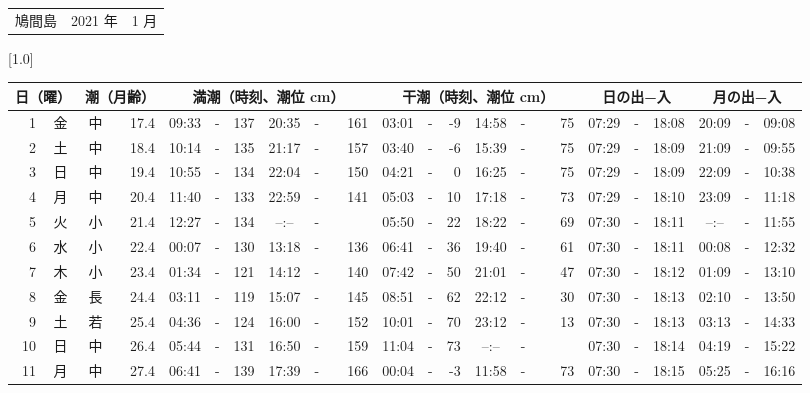 \documentclass[12pt,a4j]{jsarticle}
\begin{document}
 \begin{table}[htbp]
 \begin{center}
 \begin{tabular}{lcc}
 \LARGE{鳩間島}  & \large{2021 年} & \large{ 1 月} \\
 \end{tabular}
 \end{center}
 \begin{center}
    \scalebox{0.7}[1.0]{
    \begin{tabular}{|rc|cr|ccrccr|ccrccr|ccc|ccc|}
    \hline
    \multicolumn{2}{|c|}{日（曜）} & \multicolumn{2}{c|}{潮（月齢）} & \multicolumn{6}{c|}{満潮（時刻、潮位 cm）} & \multicolumn{6}{c|}{干潮（時刻、潮位 cm）} & \multicolumn{3}{c|}{日の出−入} &  \multicolumn{3}{c|}{月の出−入}\\
 \hline
 1 & 金 & 中 & 17.4 &  09:33 &-& 137 &  20:35 &-& 161 &  03:01 &-&  -9 &  14:58 &-&  75 & 07:29 & -& 18:08 & 20:09 & -& 09:08 \\
 2 & 土 & 中 & 18.4 &  10:14 &-& 135 &  21:17 &-& 157 &  03:40 &-&  -6 &  15:39 &-&  75 & 07:29 & -& 18:09 & 21:09 & -& 09:55 \\
 3 & 日 & 中 & 19.4 &  10:55 &-& 134 &  22:04 &-& 150 &  04:21 &-&   0 &  16:25 &-&  75 & 07:29 & -& 18:09 & 22:09 & -& 10:38 \\
 4 & 月 & 中 & 20.4 &  11:40 &-& 133 &  22:59 &-& 141 &  05:03 &-&  10 &  17:18 &-&  73 & 07:29 & -& 18:10 & 23:09 & -& 11:18 \\
 5 & 火 & 小 & 21.4 &  12:27 &-& 134 &  --:-- &-&~~~~~ &  05:50 &-&  22 &  18:22 &-&  69 & 07:30 & -& 18:11 & --:-- & -& 11:55 \\
 6 & 水 & 小 & 22.4 &  00:07 &-& 130 &  13:18 &-& 136 &  06:41 &-&  36 &  19:40 &-&  61 & 07:30 & -& 18:11 & 00:08 & -& 12:32 \\
 7 & 木 & 小 & 23.4 &  01:34 &-& 121 &  14:12 &-& 140 &  07:42 &-&  50 &  21:01 &-&  47 & 07:30 & -& 18:12 & 01:09 & -& 13:10 \\
 8 & 金 & 長 & 24.4 &  03:11 &-& 119 &  15:07 &-& 145 &  08:51 &-&  62 &  22:12 &-&  30 & 07:30 & -& 18:13 & 02:10 & -& 13:50 \\
 9 & 土 & 若 & 25.4 &  04:36 &-& 124 &  16:00 &-& 152 &  10:01 &-&  70 &  23:12 &-&  13 & 07:30 & -& 18:13 & 03:13 & -& 14:33 \\
10 & 日 & 中 & 26.4 &  05:44 &-& 131 &  16:50 &-& 159 &  11:04 &-&  73 &  --:-- &-&~~~~~ & 07:30 & -& 18:14 & 04:19 & -& 15:22 \\
11 & 月 & 中 & 27.4 &  06:41 &-& 139 &  17:39 &-& 166 &  00:04 &-&  -3 &  11:58 &-&  73 & 07:30 & -& 18:15 & 05:25 & -& 16:16 \\

\end{tabular}}
\end{center}
\end{table}
\end{document}
